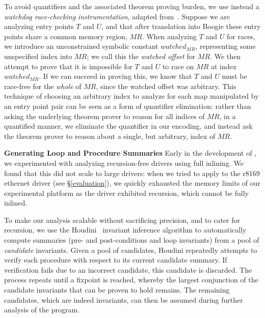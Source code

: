 To avoid quantifiers and the associated theorem proving burden, we use instead a \emph{watchdog race-checking instrumentation}, adapted from~\cite{bardsley2014engineering}.  Suppose we are analyzing entry points $T$ and $U$, and that after translation into Boogie these entry points share a common memory region, $\mathit{MR}$.  When analyzing $T$ and $U$ for races, we introduce an unconstrained symbolic constant $\mathit{watched}_{\mathit{MR}}$, representing some unspecified index into $\mathit{MR}$; we call this the \emph{watched offset} for $\mathit{MR}$.  We then attempt to prove that it is impossible for $T$ and $U$ to race on $\mathit{MR}$ at index $\mathit{watched}_{\mathit{MR}}$.  If we can succeed in proving this, we know that $T$ and $U$ must be race-free for the \emph{whole} of $\mathit{MR}$, since the watched offset was arbitrary.  This technique of choosing an arbitrary index to analyze for each map manipulated by an entry point pair can be seen as a form of quantifier elimination: rather than asking the underlying theorem prover to reason for all indices of $\mathit{MR}$, in a quantified manner, we eliminate the quantifier in our encoding, and instead ask the theorem prover to reason about a single, but arbitrary, index of $\mathit{MR}$.

\noindent\textbf{Generating Loop and Procedure Summaries }
%
Early in the development of \whoop, we experimented with analyzing recursion-free drivers using full inlining.  We found that this did not scale to large drivers: when we tried to apply \whoop to the r8169 ethernet driver (see \S\ref{evaluation}), we quickly exhausted the memory limits of our experimental platform as the driver exhibited recursion, which cannot be fully inlined.

To make our analysis scalable without sacrificing precision, and to cater for recursion, we use the Houdini~\cite{flanagan2001houdini} invariant inference algorithm to automatically compute summaries (pre- and post-conditions and loop invariants) from a pool of \emph{candidate} invariants.  Given a pool of candidates, Houdini repeatedly attempts to verify each procedure with respect to its current candidate summary.  If verification fails due to an incorrect candidate, this candidate is discarded.  The process repeats until a fixpoint is reached, whereby the largest conjunction of the candidate invariants that can be proven to hold remains.  The remaining candidates, which are indeed invariants, can then be assumed during further analysis of the program.


